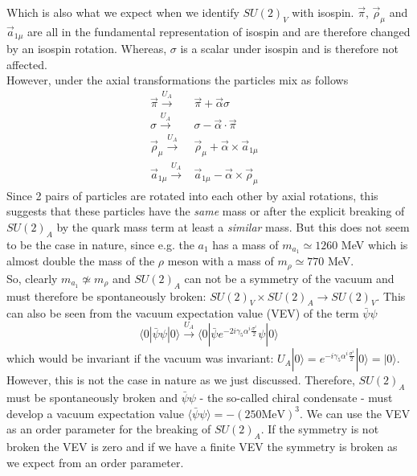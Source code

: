 Which is also what we expect when we identify $SU(2)_V$ with isospin. $\vec{\pi}$, $\vec{\rho}_{\mu}$ and $\vec{a}_{1 \mu}$ are all in the fundamental representation of isospin and are therefore changed by an isospin rotation. Whereas, $\sigma$ is a scalar under isospin and is therefore not affected. \\
However, under the axial transformations the particles mix as follows
\begin{align}
\vec{\pi} \overset{U_A}{\longrightarrow} & \vec{\pi} + \vec{\alpha} \sigma & \\
\sigma \overset{U_A}{\longrightarrow} & \sigma - \vec{\alpha} \cdot \vec{\pi} & \\
\vec{\rho}_{\mu} \overset{U_A}{\longrightarrow} & \vec{\rho}_{\mu} + \vec{\alpha} \times \vec{a}_{1 \mu} & \\
\vec{a}_{1 \mu} \overset{U_A}{\longrightarrow} & \vec{a}_{1 \mu} - \vec{\alpha} \times \vec{\rho}_{\mu}
\end{align}
Since 2 pairs of particles are rotated into each other by axial rotations, this suggests that these particles have the \textit{same} mass or after the explicit breaking of $SU(2)_A$ by the quark mass term at least a \textit{similar} mass. But this does not seem to be the case in nature, since e.g. the $a_1$ has a mass of $m_{a_1} \simeq 1260$ MeV which is almost double the mass of the $\rho$ meson with a mass of $m_{\rho} \simeq 770$ MeV. \\
So, clearly $m_{a_1} \not\simeq m_{\rho}$ and $SU(2)_A$ can not be a symmetry of the vacuum and must therefore be spontaneously broken: $SU(2)_V \times SU(2)_A \rightarrow SU(2)_V$. This can also be seen from the vacuum expectation value (VEV) of the term $\bar{\psi}\psi$ 
\begin{equation}
\label{eqn:vev} 
\langle 0 | \bar{\psi} \psi | 0 \rangle \overset{U_A}{\longrightarrow} \langle 0 |   \bar{\psi} e^{-2i \gamma_5 \alpha^i \frac{\sigma^i}{2}} \psi | 0 \rangle
\end{equation}
which would be invariant if the vacuum was invariant: $U_A | 0 \rangle = e^{-i \gamma_5 \alpha^i \frac{\sigma^i}{2}} | 0 \rangle = | 0 \rangle$. However, this is not the case in nature as we just discussed. Therefore, $SU(2)_A$ must be spontaneously broken and $\bar{\psi}\psi$ - the so-called chiral condensate - must develop a vacuum expectation value $\langle \bar{\psi}\psi \rangle = - \left( 250 \text{MeV} \right)^3$. We can use the VEV as an order parameter for the breaking of $SU(2)_A$. If the symmetry is not broken the VEV is zero and if we have a finite VEV the symmetry is broken as we expect from an order parameter. \\
